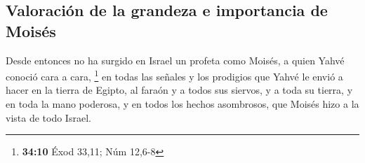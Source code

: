 \hypertarget{valoraciuxf3n-de-la-grandeza-e-importancia-de-moisuxe9s}{%
\subsection{Valoración de la grandeza e importancia de
Moisés}\label{valoraciuxf3n-de-la-grandeza-e-importancia-de-moisuxe9s}}

 Desde entonces no ha surgido en Israel un profeta como
Moisés, a quien Yahvé conoció cara a cara, \footnote{\textbf{34:10} Éxod
  33,11; Núm 12,6-8}  en todas las señales y los
prodigios que Yahvé le envió a hacer en la tierra de Egipto, al faraón y
a todos sus siervos, y a toda su tierra,  y en toda la
mano poderosa, y en todos los hechos asombrosos, que Moisés hizo a la
vista de todo Israel.
